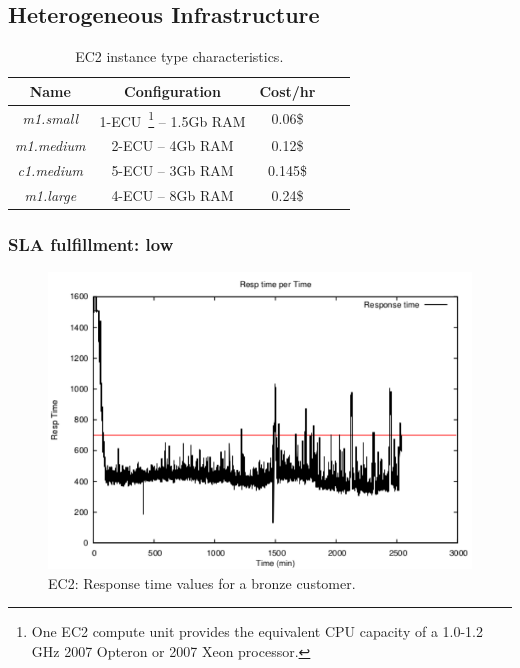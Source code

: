 





\subsection{Heterogeneous Infrastructure}

\begin{table}
  {\scriptsize 
\begin{center}
    \begin{tabular}{  | c | c | c | c | c |}
    \hline
      \textbf{Name}  & \textbf{Configuration} & \textbf{Cost/hr} \\ \hline
   \textit{m1.small}   & 1-ECU~\footnote{One EC2 compute unit provides the equivalent CPU capacity of a 1.0-1.2 GHz 2007 Opteron or 2007 Xeon processor.}  -- 1.5Gb RAM&  0.06\$ \\ \hline
   \textit{m1.medium}   & 2-ECU -- 4Gb RAM&  0.12\$ \\ \hline
\textit{c1.medium} & 5-ECU -- 3Gb RAM& 0.145\$   \\ \hline
\textit{m1.large} & 4-ECU -- 8Gb RAM& 0.24\$   \\ \hline
 \end{tabular}
\end{center}
\vspace{-5mm}
\caption{EC2 instance type characteristics.}
\label{EC2instances}
}
\end{table}

\subsubsection{SLA fulfillment: low}

\begin{figure}
  \begin{center}
    \includegraphics[width=.85\linewidth]{images/exps2011/low/ec2/proxyDataPoints_output.pdf}
  \end{center}
\vspace{-5mm}
  \caption{EC2: Response time values for a bronze customer.}
  \label{lowResponseTime}
\end{figure}

